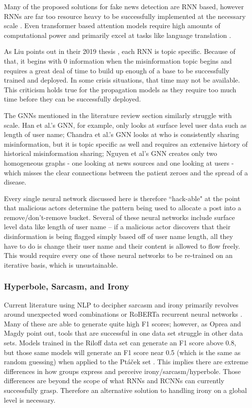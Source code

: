\documentclass[preprint,review,12pt]{elsarticle}
\begin{document}
Many of the proposed solutions for fake news detection are RNN based, however RNNs are far too resource heavy to be successfully implemented at the necessary scale \cite{gehring2017novel, sze2017efficient}. Even transformer based attention models require high amounts of computational power and primarily excel at tasks like language translation \cite{vaswani2017attention}. 

As Liu points out in their 2019 thesis \cite{liu2019early}, each RNN is topic specific. Because of that, it begins with 0 information when the misinformation topic begins and requires a great deal of time to build up enough of a base to be successfully trained and deployed. In some crisis situations, that time may not be available. This criticism holds true for the propagation models as they require too much time before they can be successfully deployed.

The GNNs mentioned in the literature review section similarly struggle with scale. Han et al.'s GNN, for example, only looks at surface level user data such as length of user name; Chandra et al.'s GNN looks at who is consistently sharing misinformation, but it is topic specific as well and requires an extensive history of historical misinformation sharing; Nguyen et al's GNN creates only two homogeneous graphs - one looking at news sources and one looking at users - which misses the clear connections between the patient zeroes and the spread of a disease.

Every single neural network discussed here is therefore ``hack-able" at the point that malicious actors determine the pattern being used to allocate a post into a remove/don't-remove bucket. Several of these neural networks include surface level data like length of user name -- if a malicious actor discovers that their disinformation is being flagged simply based off of user name length, all they have to do is change their user name and their content is allowed to flow freely. This would require every one of these neural networks to be re-trained on an iterative basis, which is unsustainable.

\subsubsection{Hyperbole, Sarcasm, and Irony}
\label{hyperbole}
Current literature using NLP to decipher sarcasm and irony primarily revolves around unexpected word combinations \cite{barbieri2014modelling,buschmeier2014impact,ghosh2015sarcastic} or RoBERTa recurrent neural networks \cite{potamias2020transformer}. Many of these are able to generate quite high F1 scores; however, as Oprea and Magdy point out, tools that are successful in one data set struggle in other data sets. Models trained in the Riloff data set can generate an F1 score above 0.8, but those same models will generate an F1 score near 0.5 (which is the same as random guessing) when applied to the Pt{\'a}{\v{c}}ek set \cite{oprea2019exploring}. This implies there are extreme differences in how groups express and perceive irony/sarcasm/hyperbole. Those differences are beyond the scope of what RNNs and RCNNs can currently successfully grasp. Therefore an alternative solution to handling irony on a global level is necessary. 
 
\end{document}

